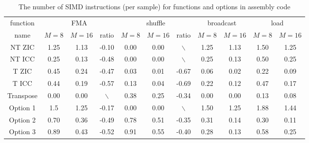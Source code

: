 \begin{table}[t]
    \caption{The number of SIMD instructions (per sample) for functions and options in assembly code}  %
    \centering %
    \setlength{\tabcolsep}{1.2pt}
    \begin{tabular}{c|c|c|c|c|c|c|c|c|c|c} %
    \hline\hline %
    function & \multicolumn{3}{c|}{FMA} & \multicolumn{3}{c|}{shuffle} & \multicolumn{2}{c|}{broadcast} & \multicolumn{2}{c}{load} \\ [0.4ex]
    \cline{2-11}
    name & $M{=}8$ & $M{=}16$ & ratio & $M{=}8$ & $M{=}16$ & ratio & $M{=}8$ & $M{=}16$ & $M{=}8$ & $M{=}16$ \\ [0.4ex] %
    \hline
    NT ZIC & 1.25 & 1.13 & -0.10 & 0.00 & 0.00 & $\backslash$ & 1.25 & 1.13 & 1.50 & 1.25 \\ [0.4ex]
    NT ICC & 0.25 & 0.13 & -0.48 & 0.00 & 0.00 & $\backslash$ & 0.25 & 0.13 & 0.50 & 0.25 \\ [0.4ex]
    T ZIC & 0.45 & 0.24 & -0.47 & 0.03 & 0.01 & -0.67 & 0.06 & 0.02 & 0.22 & 0.09 \\ [0.4ex]
    T ICC & 0.44 & 0.19 & -0.57 & 0.13 & 0.04 & -0.69 & 0.22 & 0.12 & 0.47 & 0.17 \\ [0.4ex]
    Transpose & 0.00 & 0.00 & $\backslash$ & 0.38 & 0.25 & -0.34 & 0.00 & 0.00 & 0.13 & 0.08 \\ [0.4ex]
    Option 1 & 1.5 & 1.25 & -0.17 & 0.00 & 0.00 & $\backslash$ & 1.50 & 1.25 & 1.88 & 1.44 \\ [0.4ex]
    Option 2 & 0.70 & 0.36 & -0.49 & 0.78 & 0.51 & -0.35 & 0.31 & 0.14 & 0.30 & 0.11 \\ [0.4ex]
    Option 3 & 0.89 & 0.43 & -0.52 & 0.91 & 0.55 & -0.40 & 0.28 & 0.13 & 0.58 & 0.25 \\ [0.4ex]
    \hline
    \end{tabular}
    \label{table:number_of_instructions_of_functions_in_assembly} %
\end{table}

